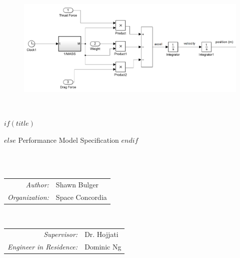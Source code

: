 \documentclass[$if(fontsize)$$fontsize$,$endif$$if(lang)$$lang$,$endif$$if(papersize)$$papersize$,$endif$$for(classoption)$$classoption$$sep$,$endfor$]{$documentclass$}
\begin{document}
\begin{titlepage}
\begin{figure}[ht]
    \centering
    \includegraphics[scale=0.15]{../images/vertical_model_simplified.png}\\
\end{figure}


\HRule \\[0.3cm]
{ \Huge \bfseries 
$if(title)$
\maketitle
$else$
Performance Model Specification
$endif$
}\\[0.4cm] 

\HRule \\[1cm]
 

\begin{minipage}{0.4\textwidth}
\begin{flushleft} \large
	\begin{tabular} {r l} 
		\emph{Author:}			& 	Shawn Bulger	\\
		\emph{Organization:}     & 	Space Concordia	\\
	\end{tabular}
\end{flushleft}
\end{minipage}
~
\begin{minipage}{0.4\textwidth}
\begin{flushright} \large
	\begin{tabular} {r l} 
		\emph{Supervisor:} 		        &   Dr. Hojjati 		\\
		\emph{Engineer in Residence:} 	&   Dominic Ng  		\\
	\end{tabular}
\end{flushright}
\end{minipage}\\[2cm]


\end{titlepage}
\end{document}
